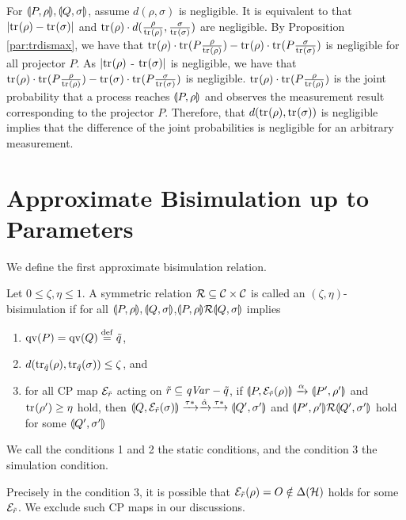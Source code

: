 For $\llparenthesis P, \rho \rrparenthesis, \llparenthesis Q, \sigma \rrparenthesis$, assume
$d(\rho, \sigma)$ is negligible. It is equivalent to that
$|{\rm tr}_{}(\rho) - {\rm tr}_{}(\sigma)|$ and ${\rm tr}_{}(\rho) \cdot
d(\frac{\rho}{{\rm tr}_{}(\rho)}, \frac{\sigma}{{\rm tr}_{}(\sigma)})$ are
negligible. By Proposition \ref{par:trdismax}, 
we have that ${\rm tr}_{}(\rho) \cdot {\rm tr}_{}(P\frac{\rho}{{\rm tr}_{}(\rho)}) - 
{\rm tr}_{}(\rho) \cdot {\rm tr}_{}(P\frac{\sigma}{{\rm tr}_{}(\sigma)})$ is negligible
for all projector $P$. As $|{\rm tr}_{}(\rho)$ - ${\rm tr}_{}(\sigma)|$ is
negligible, we have that
${\rm tr}_{}(\rho) \cdot {\rm tr}_{}(P\frac{\rho}{{\rm tr}_{}(\rho)}) - 
{\rm tr}_{}(\sigma) \cdot {\rm tr}_{}(P\frac{\sigma}{{\rm tr}_{}(\sigma)})$ is negligible.
${\rm tr}_{}(\rho) \cdot {\rm tr}_{}(P\frac{\rho}{{\rm tr}_{}(\rho)})$ is the joint
probability that a process reaches $\llparenthesis P, \rho \rrparenthesis$ and observes
the measurement result corresponding to the projector $P$.
Therefore, that $d({\rm tr}_{}(\rho), {\rm tr}_{}(\sigma))$ is negligible implies
that the difference of the joint probabilities is negligible for an
arbitrary measurement.

\section{Approximate Bisimulation up to Parameters}
\label{par}
We define the first approximate bisimulation relation.
\begin{defi}
\label{par:defofzetaetarel}
 Let $0 \le \zeta, \eta \le 1$. A symmetric relation $\mathcal{R} \subseteq \mathcal{C} \times \mathcal{C}$
 is called an $(\zeta,\eta)$-bisimulation if for all
 $\llparenthesis P, \rho \rrparenthesis,\llparenthesis Q, \sigma \rrparenthesis$,$\llparenthesis P, \rho \rrparenthesis \mathcal{R} \llparenthesis Q, \sigma \rrparenthesis$
 implies 
\begin{enumerate}
 \item $\mathrm{qv}(P)=\mathrm{qv}(Q) \overset{\mathrm{def}}{=} \tilde q$,
 \item $d({\rm tr}_{\tilde q}(\rho), {\rm tr}_{\tilde q}(\sigma)) \le \zeta$, and
 \item for all CP map $\mathcal{E}_{\tilde r}$ acting on 
       $\tilde r \subseteq \mathit{qVar} - \tilde q$,
       if $\llparenthesis P, \mathcal{E}_{\tilde r}(\rho) \rrparenthesis \xrightarrow{\alpha}
       \llparenthesis P', \rho' \rrparenthesis$ and ${\rm tr}_{}(\rho') \ge \eta$ hold,
       then $\llparenthesis Q, \mathcal{E}_{\tilde r}(\sigma) \rrparenthesis \xrightarrow{\tau*}
       \xrightarrow{\hat \alpha}
       \xrightarrow{\tau*} \llparenthesis Q', \sigma' \rrparenthesis$ and
       $\llparenthesis P', \rho' \rrparenthesis\mathcal{R} \llparenthesis Q', \sigma' \rrparenthesis$ hold for some
       $\llparenthesis Q', \sigma' \rrparenthesis$
\end{enumerate}
We call the conditions 1 and 2 the static conditions, and
the condition 3 the simulation condition.
\end{defi}
Precisely in the condition 3, it is possible that $\mathcal{E}_{\tilde r}(\rho) = O
\notin \Delta(\mathcal{H})$ holds for some $\mathcal{E}_{\tilde r}$. We exclude such
CP maps in our discussions.

